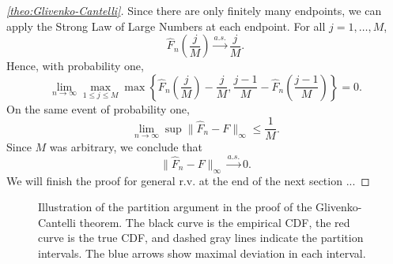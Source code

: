 \begin{proof}[\autoref{theo:Glivenko-Cantelli}]
Since there are only finitely many endpoints, we can apply the Strong Law of Large Numbers at each endpoint.
    For all \(j=1,\dots ,M\), \[
        \hat{F}_{n}\left( \frac{j}{M} \right) \overset{a.s.}{\longrightarrow} \frac{j}{M}.
    \]
    Hence, with probability one, \[
        \lim\limits_{n \to \infty} \max\limits_{1\le j\le M} \max \left\{ \hat{F}_{n}\left( \frac{j}{M} \right) -\frac{j}{M}, \frac{j-1}{M}-\hat{F}_{n}\left( \frac{j-1}{M} \right)  \right\} = 0.
    \]
    On the same event of probability one,
    \[
        \lim\limits_{n \to \infty} \sup \| \hat{F}_{n}-F\|_{\infty}\le \frac{1}{M}.
    \]
    Since \(M\) was arbitrary, we conclude that \[
        \| \hat{F}_{n}-F\|_{\infty} \overset{a.s.}{\longrightarrow}0.
    \]
    We will finish the proof for general r.v. at the end of the next section ...
\end{proof}


\begin{figure}[h!]
    \centering
    \caption{Illustration of the partition argument in the proof of the Glivenko-Cantelli theorem. The black curve is the empirical CDF, the red curve is the true CDF, and dashed gray lines indicate the partition intervals. The blue arrows show maximal deviation in each interval.}
    \label{fig:GC-partition}
\end{figure}


